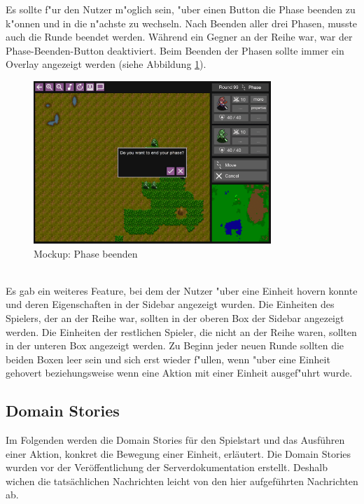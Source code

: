\documentclass[12pt, titlepage]{scrartcl}
\newcounter{subsubsubsection}[subsubsection]
\begin{document}
			        Es sollte f"ur den Nutzer m"oglich sein, "uber einen Button die Phase beenden zu k"onnen und in die n"achste zu wechseln. Nach Beenden aller drei Phasen, musste auch die Runde beendet werden. W\"ahrend ein Gegner an der Reihe war, war der Phase-Beenden-Button deaktiviert. Beim Beenden der Phasen sollte immer ein Overlay angezeigt werden (siehe Abbildung \ref{Phase_End}). \\
			        \begin{figure}[H] 
    				    \centering
    				    \includegraphics[width=0.8\textwidth]{images/mockups/EndPhase.png}
    				    \caption{Mockup: Phase beenden}
    				    \label{Phase_End}
			        \end{figure}
			        \ \\ Es gab ein weiteres Feature, bei dem der Nutzer "uber eine Einheit hovern konnte und deren Eigenschaften in der Sidebar angezeigt wurden. Die Einheiten des Spielers, der an der Reihe war, sollten in der oberen Box der Sidebar angezeigt werden. Die Einheiten der restlichen Spieler, die nicht an der Reihe waren, sollten in der unteren Box angezeigt werden. Zu Beginn jeder neuen Runde sollten die beiden Boxen leer sein und sich erst wieder f"ullen, wenn "uber eine Einheit gehovert beziehungsweise wenn eine Aktion mit einer Einheit ausgef"uhrt wurde.
		\subsection{Domain Stories}
		    Im Folgenden werden die Domain Stories f\"ur den Spielstart und das Ausf\"uhren einer Aktion, konkret die Bewegung einer Einheit, erl\"autert. Die Domain Stories wurden vor der Ver\"offentlichung der Serverdokumentation erstellt. Deshalb wichen die tats\"achlichen Nachrichten leicht von den hier aufgef\"uhrten Nachrichten ab. \\
\end{document}

